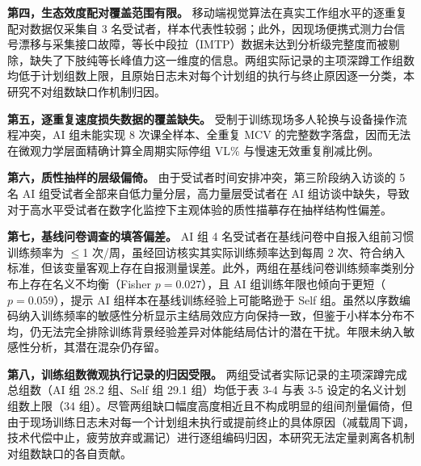 \documentclass[UTF8,zihao=-4,twoside,openany]{ctexbook}
\begin{document}
\textbf{第四，生态效度配对覆盖范围有限。} 移动端视觉算法在真实工作组水平的逐重复配对数据仅采集自 3 名受试者，样本代表性较弱；此外，因现场便携式测力台信号漂移与采集接口故障，等长中段拉（IMTP）数据未达到分析级完整度而被剔除，缺失了下肢纯等长峰值力这一维度的信息。两组实际记录的主项深蹲工作组数均低于计划组数上限，且原始日志未对每个计划组的执行与终止原因逐一分类，本研究不对组数缺口作机制归因。

\textbf{第五，逐重复速度损失数据的覆盖缺失。} 受制于训练现场多人轮换与设备操作流程冲突，AI 组未能实现 8 次课全样本、全重复 MCV 的完整数字落盘，因而无法在微观力学层面精确计算全周期实际停组 VL\% 与慢速无效重复削减比例。

\textbf{第六，质性抽样的层级偏倚。} 由于受试者时间安排冲突，第三阶段纳入访谈的 5 名 AI 组受试者全部来自低力量分层，高力量层受试者在 AI 组访谈中缺失，导致对于高水平受试者在数字化监控下主观体验的质性描摹存在抽样结构性偏差。

\textbf{第七，基线问卷调查的填答偏差。} AI 组 4 名受试者在基线问卷中自报入组前习惯训练频率为 $\le$1 次/周，虽经回访核实其实际训练频率达到每周 2 次、符合纳入标准，但该变量客观上存在自报测量误差。此外，两组在基线问卷训练频率类别分布上存在名义不均衡（Fisher $p=0.027$），且 AI 组训练年限也倾向于更短（$p=0.059$），提示 AI 组样本在基线训练经验上可能略逊于 Self 组。虽然以序数编码纳入训练频率的敏感性分析显示主结局效应方向保持一致，但鉴于小样本分布不均，仍无法完全排除训练背景经验差异对体能结局估计的潜在干扰。年限未纳入敏感性分析，其潜在混杂仍存留。

\textbf{第八，训练组数微观执行记录的归因受限。} 两组受试者实际记录的主项深蹲完成总组数（AI 组 28.2 组、Self 组 29.1 组）均低于表 3-4 与表 3-5 设定的名义计划组数上限（34 组）。尽管两组缺口幅度高度相近且不构成明显的组间剂量偏倚，但由于现场训练日志未对每一个计划组未执行或提前终止的具体原因（减载周下调，技术代偿中止，疲劳放弃或漏记）进行逐组编码归因，本研究无法定量剥离各机制对组数缺口的各自贡献。
\end{document}
